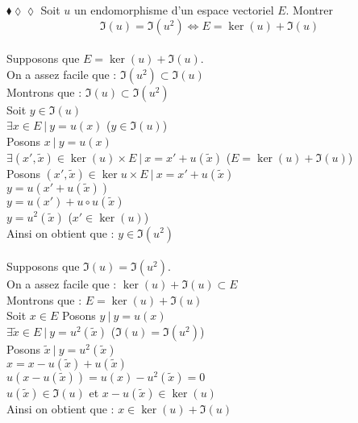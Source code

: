 \documentclass[11pt]{article}
\begin{document}
\begin{exercise}{$\blacklozenge\lozenge\lozenge$}{}
    Soit $u$ un endomorphisme d'un espace vectoriel $E$. Montrer
    \begin{equation*}
        \Im{(u)} = \Im{(u^{2})} \iff E = \ker{(u)} + \Im{(u)}
    \end{equation*}
    \tcblower\\[0.2cm]
    \fbox{$\Leftarrow$} Supposons que $E = \ker{(u)} + \Im{(u)}$.\\
    On a assez facile que : $\Im{(u^{2})} \subset \Im{(u)}$\\
    Montrons que : $\Im{(u)} \subset \Im{(u^{2})}$\\
    Soit $y \in \Im{(u)}$\\
    $\exists x \in E ~|~ y = u{(x)}$ ($y \in \Im{(u)}$)\\
    Posons $x ~|~ y = u{(x)}$\\
    $\exists (x', \widetilde{x}) \in \ker{(u)} \times E ~|~ x = x' + u{(\widetilde{x})}$ ($E = \ker{(u)} + \Im{(u)}$)\\
    Posons $(x', \widetilde{x}) \in \ker{u} \times E ~|~ x = x' + u{(\widetilde{x})}$\\
    $y = u{(x' + u{(\widetilde{x})})}$\\
    $y = u{(x')} + u \circ u{(\widetilde{x})}$\\
    $y = u^{2}{(\widetilde{x})}$ ($x' \in \ker{(u)}$)\\
    Ainsi on obtient que : $y \in \Im{(u^{2})}$\\\\
    \fbox{$\Rightarrow$} Supposons que $\Im{(u)} = \Im{(u^{2})}$.\\
    On a assez facile que : $\ker{(u)} + \Im{(u)} \subset E$\\
    Montrons que : $E = \ker{(u)} + \Im{(u)}$\\
    Soit $x \in E$
    Posons $y ~|~ y = u{(x)}$\\
    $\exists \widetilde{x} \in E ~|~ y = u^{2}{(\widetilde{x})}$ ($\Im{(u)} = \Im{(u^{2})}$)\\
    Posons $\widetilde{x} ~|~ y = u^{2}{(\widetilde{x})}$\\
    $x = x - u{(\widetilde{x})} + u{(\widetilde{x})}$\\
    $u{(x - u{(\widetilde{x})})} = u{(x)} - u^{2}{(\widetilde{x})} = 0$\\
    $u{(\widetilde{x})} \in \Im{(u)}$ et $x - u{(\widetilde{x})} \in \ker{(u)}$\\
    Ainsi on obtient que : $x \in \ker{(u)} + \Im{(u)}$
\end{exercise}
\end{document}
